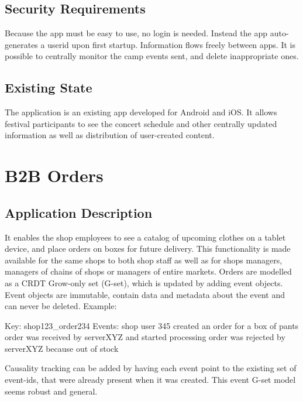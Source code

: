 \documentclass[11pt,a4paper]{report}
\begin{document}
\subsection{Security Requirements}
Because the app must be easy to use, no login is needed. Instead the app auto-generates a userid upon first startup.
Information flows freely between apps.
It is possible to centrally monitor the camp events sent, and delete inappropriate ones.

\subsection{Existing State}
The application is an existing app developed for Android and iOS. It allows festival participants to see the concert schedule and other centrally updated information as well as distribution of user-created content.


\section{B2B Orders}
\subsection{Application Description}
It enables the shop employees to see a catalog of upcoming clothes on a tablet device, and place orders on boxes for future delivery. This functionality is made available for the same shops to both shop staff as well as for shops managers, managers of chains of shops or managers of entire markets.
Orders are modelled as a CRDT Grow-only set (G-set), which is updated by adding event objects. Event objects are immutable, contain data and metadata about the event and can never be deleted. Example:

Key: shop123\_order234
Events:
shop user 345 created an order for a box of pants
order was received by serverXYZ and started processing
order was rejected by serverXYZ because out of stock

Causality tracking can be added by having each event point to the existing set of event-ids, that were already present when it was created. This event G-set model seems robust and general.
\end{document}
